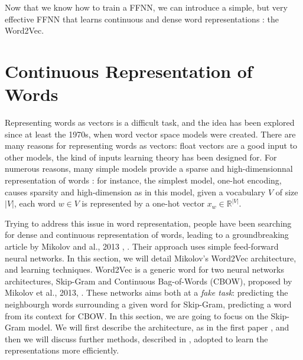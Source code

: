 \documentclass{article}
\newcommand{\R}{\mathbb R}
\begin{document}
Now that we know how to train a FFNN, we can introduce a simple, but very effective FFNN that 
learns continuous and dense word representations : the Word2Vec.



















\newpage
\section{Continuous Representation of Words}\label{sec:word2vec}


Representing words as vectors is a difficult task, and the idea has been 
explored since at least the 1970s, when word vector space models were created. 
There are many reasons for representing words as vectors: float vectors are 
a good input to other models, the kind of inputs learning theory
has been designed for. 
For numerous reasons, many simple models provide a sparse and high-dimensionnal 
representation of words : for instance, the simplest model, one-hot encoding, causes sparsity 
and high-dimension as in this model, given a vocabulary $V$ of size 
$|V|$, each word $w\in V$ is represented by a one-hot vector $x_w\in\R^{|V|}$. 


Trying to address this issue in word representation, people have been
searching for dense and continuous representation of words, leading to a 
groundbreaking article by Mikolov and al., 2013 \cite{NIPS2013_5021b},   
\cite{Mikolov2013EfficientSpace}.
 Their approach uses simple feed-forward neural networks. In this section, we will detail 
Mikolov's Word2Vec architecture, and learning techniques. Word2Vec is a generic word for two neural networks architectures, Skip-Gram and 
Continuous Bag-of-Words (CBOW), proposed by Mikolov et al., 2013, \cite{Mikolov2013EfficientSpace}. 
These networks aims both at a \textit{fake task}: predicting the neighbourgh words 
surrounding a given word for Skip-Gram, predicting a word from its context for CBOW. 
In this section, we are going to focus on the Skip-Gram model.  We will first describe the architecture, 
as in the first paper \cite{Mikolov2013EfficientSpace}
, and then we will discuss further methods, described in \cite{NIPS2013_5021b}, 
adopted to learn the representations more efficiently.
\end{document}
